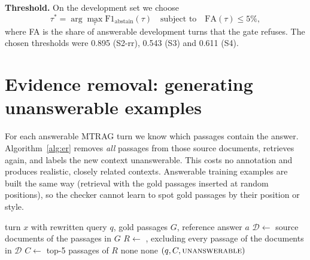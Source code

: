 \documentclass[11pt,a4paper]{report}
\newcommand{\sys}[1]{\textsf{#1}}
\begin{document}
\textbf{Threshold.} On the development set we choose
\[
\tau^* = \arg\max_\tau \text{F1}_\text{abstain}(\tau) \quad\text{subject to}\quad \text{FA}(\tau) \le 5\%,
\]
where FA is the share of answerable development turns that the gate refuses. The chosen thresholds were 0.895 (\sys{S2-rr}), 0.543 (\sys{S3}) and 0.611 (\sys{S4}).

\section{Evidence removal: generating unanswerable examples}\label{sec:er}
For each answerable MTRAG turn we know which passages contain the answer. Algorithm~\ref{alg:er} removes \emph{all} passages from those source documents, retrieves again, and labels the new context unanswerable. This costs no annotation and produces realistic, closely related contexts. Answerable training examples are built the same way (retrieval with the gold passages inserted at random positions), so the checker cannot learn to spot gold passages by their position or style.

\begin{algorithm}[H]
\caption{Evidence removal for one answerable turn}
\label{alg:er}
\begin{algorithmic}[1]
\Require turn $x$ with rewritten query $q$, gold passages $G$, reference answer $a$
\State $\mathcal{D} \gets$ source documents of the passages in $G$
\State $R \gets$ , excluding every passage of the documents in $\mathcal{D}$
\State $C \gets$ top-5 passages of $R$
 \Return none 
\EndIf
{} \Return none 
\EndIf
\State \Return $(q, C, \textsc{unanswerable})$
\end{algorithmic}
\end{algorithm}
\end{document}
